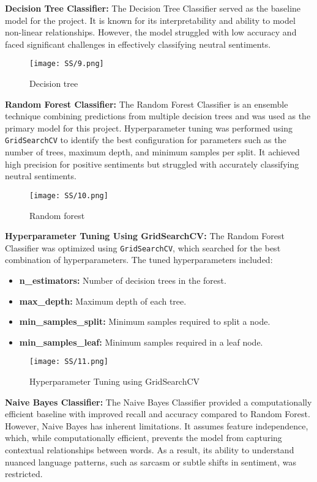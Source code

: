 \documentclass[journal]{IEEEtran}
\begin{document}
\textbf{Decision Tree Classifier:}
The Decision Tree Classifier served as the baseline model for the project. It is known for its interpretability and ability to model non-linear relationships. However, the model struggled with low accuracy and faced significant challenges in effectively classifying neutral sentiments.
\begin{figure}[H]
\centering
\texttt{[image: SS/9.png]}
\caption{Decision tree}
\end{figure}
\textbf{Random Forest Classifier:}
The Random Forest Classifier is an ensemble technique combining predictions from multiple decision trees and was used as the primary model for this project. Hyperparameter tuning was performed using \texttt{GridSearchCV} to identify the best configuration for parameters such as the number of trees, maximum depth, and minimum samples per split. It achieved high precision for positive sentiments but struggled with accurately classifying neutral sentiments.
\begin{figure}[H]
\centering
\texttt{[image: SS/10.png]}
\caption{Random forest}
\end{figure}
\textbf{Hyperparameter Tuning Using GridSearchCV:}
The Random Forest Classifier was optimized using \texttt{GridSearchCV}, which searched for the best combination of hyperparameters. The tuned hyperparameters included:
\begin{itemize}
    \item \textbf{n\_estimators:} Number of decision trees in the forest.
    \item \textbf{max\_depth:} Maximum depth of each tree.
    \item \textbf{min\_samples\_split:} Minimum samples required to split a node.
    \item \textbf{min\_samples\_leaf:} Minimum samples required in a leaf node.
\end{itemize}
\begin{figure}[H]
\centering
\texttt{[image: SS/11.png]}
\caption{Hyperparameter Tuning using GridSearchCV}
\end{figure}
\textbf{Naive Bayes Classifier:}
The Naive Bayes Classifier provided a computationally efficient baseline with improved recall and accuracy compared to Random Forest. However, Naive Bayes has inherent limitations. It assumes feature independence, which, while computationally efficient, prevents the model from capturing contextual relationships between words. As a result, its ability to understand nuanced language patterns, such as sarcasm or subtle shifts in sentiment, was restricted.
\end{document}
